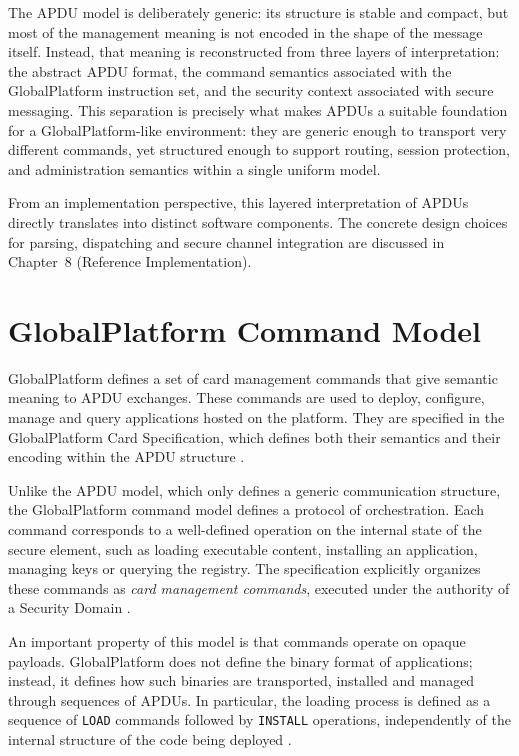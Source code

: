The APDU model is deliberately generic: its structure is stable and compact,
but most of the management meaning is not encoded in the shape of the message
itself. Instead, that meaning is reconstructed from three layers of
interpretation: the abstract APDU format, the command semantics associated with
the GlobalPlatform instruction set, and the security context associated with
secure messaging.  This separation is precisely what makes APDUs a suitable
foundation for a GlobalPlatform-like environment: they are generic enough to
transport very different commands, yet structured enough to support routing,
session protection, and administration semantics within a single uniform model.

From an implementation perspective, this layered interpretation of APDUs
directly translates into distinct software components. The concrete design
choices for parsing, dispatching and secure channel integration are discussed
in Chapter~8 (Reference Implementation).

\section{GlobalPlatform Command Model}

GlobalPlatform defines a set of card management commands that give semantic
meaning to APDU exchanges. These commands are used to deploy, configure, manage
and query applications hosted on the platform. They are specified in the
GlobalPlatform Card Specification, which defines both their semantics and their
encoding within the APDU structure .

Unlike the APDU model, which only defines a generic communication structure,
the GlobalPlatform command model defines a protocol of orchestration. Each
command corresponds to a well-defined operation on the internal state of the
secure element, such as loading executable content, installing an application,
managing keys or querying the registry. The specification explicitly organizes
these commands as \emph{card management commands}, executed under the authority
of a Security Domain .

An important property of this model is that commands operate on opaque
payloads. GlobalPlatform does not define the binary format of applications;
instead, it defines how such binaries are transported, installed and managed
through sequences of APDUs. In particular, the loading process is defined as a
sequence of \texttt{LOAD} commands followed by \texttt{INSTALL} operations,
independently of the internal structure of the code being deployed
.

